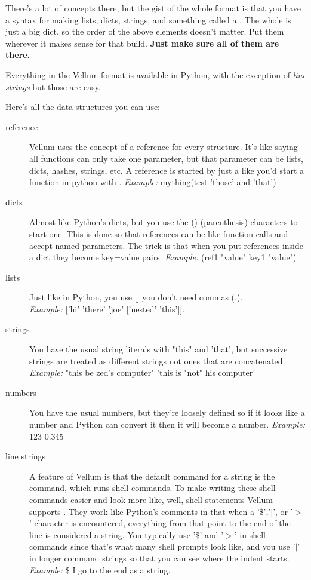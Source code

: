 There's a lot of concepts there, but the gist of the whole format is that you
have a syntax for making lists, dicts, strings, and something called a
.  The whole  is just a big dict, so the order of the
above elements doesn't matter.  Put them wherever it makes sense for that build.
{\bf Just make sure all of them are there.}

Everything in the Vellum format is available in Python, with the exception of
\emph{line strings} but those are easy. 

Here's all the data structures you can use:

\begin{description}
\item[reference]  Vellum uses the concept of a reference for every structure.
    It's like saying all functions can only take one parameter, but that parameter
    can be lists, dicts, hashes, strings, etc.  A reference is started by just a
     like you'd start a function in python with .
    \emph{Example:} mything(test 'those' and 'that')

\item[dicts] Almost like Python's dicts, but you use the () (parenthesis)
            characters to start one.  This is done so that references 
            can be like function calls and accept named
            parameters.  The trick is that when you put references inside
            a dict they become key=value pairs.
            \emph{Example:} (ref1 "value" key1 "value") 

\item[lists] Just like in Python, you use [] you don't need commas (,).\\
            \emph{Example:} ['hi' 'there' 'joe' ['nested' 'this']].

\item[strings] You have the usual string literals with "this" and 'that', but
    successive strings are treated as different strings not ones that are
    concatenated.
    \emph{Example:} "this be zed's computer" 'this is "not" his computer'

\item[numbers] You have the usual numbers, but they're loosely defined so if it
        looks like a number and Python can convert it then it will become a number.
        \emph{Example:} 123 0.345

\item[line strings]  A feature of Vellum is that the default command for a
    string is the  command, which runs shell commands.  To make
    writing these shell commands easier and look more like, well, shell
    statements Vellum supports .  They work like Python's
    comments in that when a '\$','$|$', or '$>$' character is encountered,
    everything from that point to the end of the line is considered a string.
    You typically use '\$' and '$>$' in shell commands since that's what many
    shell prompts look like, and you use '$|$' in longer  command
    strings so that you can see where the indent starts.
    \emph{Example:} \$ I go to the end as a string.

\end{description}

